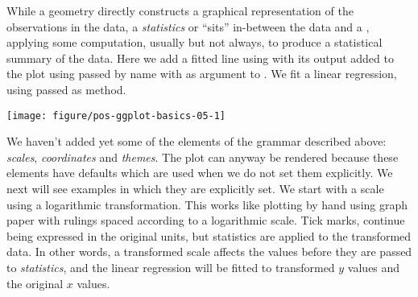\documentclass[krantz2]{krantz}\usepackage{knitr}%
\begin{document}
While a geometry directly constructs a graphical representation of the observations in the data, a \emph{statistics} or  ``sits'' in-between the data and a , applying some computation, usually but not always, to produce a statistical summary of the data. Here we add a fitted line using  with its output added to the plot using  passed by name with  as argument to . We fit a linear regression, using  passed as method.

\begin{knitrout}\footnotesize
{}\color{fgcolor}\begin{kframe}
\begin{alltt}
\hlstd{(} 
       \hlstd{(}    \hlopt{+}
  \hlstd{()} \hlopt{+}
  \hlstd{(} \hlstd{=} \hlstd{,}  \hlstd{=} \hlstd{)}
\end{alltt}
\end{kframe}

{\centering \texttt{[image: figure/pos-ggplot-basics-05-1]} 

}



\end{knitrout}

We haven't added yet some of the elements of the grammar described above: \emph{scales}, \emph{coordinates} and \emph{themes}. The plot can anyway be rendered because these elements have defaults which are used when we do not set them explicitly. We next will see examples in which they are explicitly set. We start with a scale using a logarithmic transformation. This works like plotting by hand using graph paper with rulings spaced according to a logarithmic scale. Tick marks, continue being expressed in the original units, but statistics are applied to the transformed data. In other words, a transformed scale affects the values before they are passed to \emph{statistics}, and the linear regression will be fitted to  transformed $y$ values and the original $x$ values.
\end{document}

